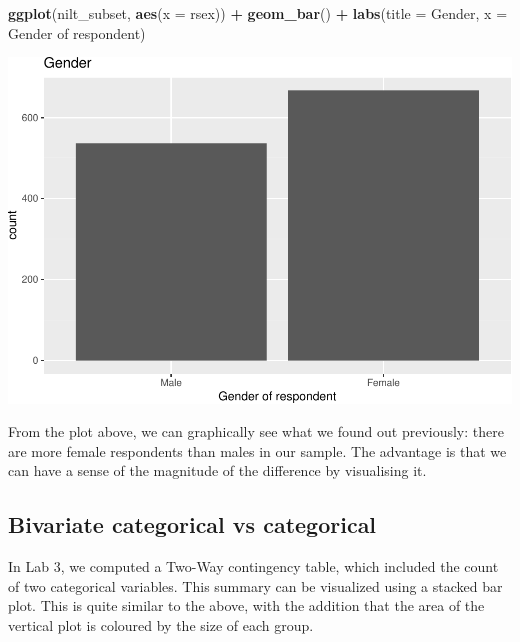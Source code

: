 \documentclass[
]{book}
\newenvironment{Shaded}{\begin{snugshade}}{\end{snugshade}}
\newcommand{\AttributeTok}[1]{\textcolor[rgb]{0.13,0.29,0.53}{#1}}
\newcommand{\FunctionTok}[1]{\textcolor[rgb]{0.13,0.29,0.53}{\textbf{#1}}}
\newcommand{\NormalTok}[1]{#1}
\newcommand{\SpecialCharTok}[1]{\textcolor[rgb]{0.81,0.36,0.00}{\textbf{#1}}}
\newcommand{\StringTok}[1]{\textcolor[rgb]{0.31,0.60,0.02}{#1}}
\begin{document}
\begin{Shaded}
\begin{Highlighting}[]
\FunctionTok{ggplot}\NormalTok{(nilt\_subset, }\FunctionTok{aes}\NormalTok{(}\AttributeTok{x =}\NormalTok{ rsex)) }\SpecialCharTok{+}
  \FunctionTok{geom\_bar}\NormalTok{() }\SpecialCharTok{+}
  \FunctionTok{labs}\NormalTok{(}\AttributeTok{title =} \StringTok{\textquotesingle{}Gender\textquotesingle{}}\NormalTok{, }\AttributeTok{x =} \StringTok{\textquotesingle{}Gender of respondent\textquotesingle{}}\NormalTok{)}
\end{Highlighting}
\end{Shaded}

\begin{flushleft}\includegraphics[width=1\linewidth]{lab-workbook_files/figure-latex/unnamed-chunk-65-1} \end{flushleft}

From the plot above, we can graphically see what we found out previously: there are more female respondents than males in our sample. The advantage is that we can have a sense of the magnitude of the difference by visualising it.

\hypertarget{bivariate-categorical-vs-categorical}{%
\subsection{Bivariate categorical vs categorical}\label{bivariate-categorical-vs-categorical}}

In Lab 3, we computed a Two-Way contingency table, which included the count of two categorical variables. This summary can be visualized using a stacked bar plot. This is quite similar to the above, with the addition that the area of the vertical plot is coloured by the size of each group.
\end{document}

